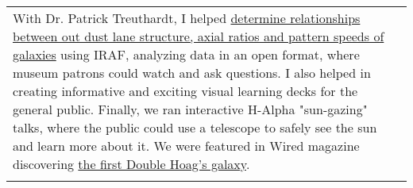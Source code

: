 \documentclass[a4paper, 9pt]{article} %
\begin{document}
\begin{tabular}{l|p{14cm}}
{With Dr. Patrick Treuthardt, I helped \href{https://ui.adsabs.harvard.edu/abs/2014AAS...22345312T/abstract}{determine relationships between out dust lane structure, axial ratios and pattern speeds of galaxies} using IRAF, analyzing data in an open format, where museum patrons could watch and ask questions. I also helped in creating informative and exciting visual learning decks for the general public. Finally, we ran interactive H-Alpha "sun-gazing" talks, where the public could use a telescope to safely see the sun and learn more about it. We were featured in Wired magazine discovering \href{http://www.wired.co.uk/article/new-hoag-type-galaxy-discovered}{the first Double Hoag's galaxy}.}\\
\multicolumn{2}{c}{} 




\end{tabular}
\end{document}
